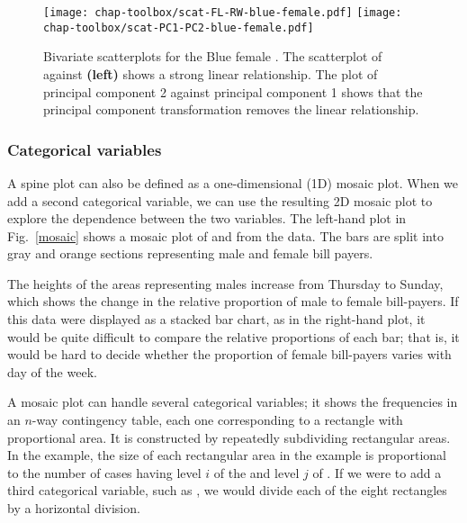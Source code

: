 \begin{figure}[htp]
\centerline{
 {\texttt{[image: chap-toolbox/scat-FL-RW-blue-female.pdf]}}
 {\texttt{[image: chap-toolbox/scat-PC1-PC2-blue-female.pdf]}}}
\caption[Bivariate scatterplots for the Blue female ]{Bivariate scatterplots for the Blue female .  The scatterplot of  against  {\bf (left)} shows a strong linear relationship.  The plot of
principal component 2 against principal component 1 shows that the
principal component transformation removes the linear relationship.}
\label{scat}
\end{figure}

\subsubsection{Categorical variables}


A spine plot can also be defined as a one-dimensional (1D) mosaic
plot.  When we add a second categorical variable, we can use the
resulting 2D mosaic plot to explore the dependence between the two
variables.  The left-hand plot in Fig.~\ref{mosaic} shows a mosaic
plot of  and  from the  data.  The bars
are split into gray and orange sections representing male and female
bill payers.


The heights of the areas representing males increase from Thursday to
Sunday, which shows the change in the relative proportion of male to
female bill-payers.  If this data were displayed as a stacked bar
chart, as in the right-hand plot, it would be quite difficult to
compare the relative proportions of each bar; that is, it would be
hard to decide whether the proportion of female bill-payers varies
with day of the week.

A mosaic plot can handle several categorical variables; it shows the
frequencies in an $n$-way contingency table, each one corresponding to
a rectangle with proportional area.  It is constructed by repeatedly
subdividing rectangular areas.  In the example, the size of each
rectangular area in the example is proportional to the number of
cases having level $i$ of the  and level $j$ of .
If we were to add a third categorical variable, such as ,
we would divide each of the eight rectangles by a horizontal division.

